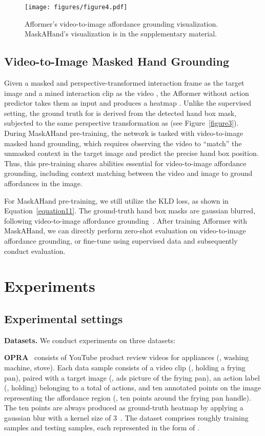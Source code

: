 \documentclass[10pt,twocolumn,letterpaper]{article}
\begin{document}
{\begin{figure*}[t]
    \centering
    \texttt{[image: figures/figure4.pdf]}
    \caption{Afformer's video-to-image affordance grounding visualization. MaskAHand's visualization is in the supplementary material. \vspace{-3mm}}
    \label{figure4}
\end{figure*}

\subsection{Video-to-Image Masked Hand Grounding}

Given a masked and perspective-transformed interaction frame as the target image  and a mined interaction clip as the video , the Afformer without action predictor  takes them as input and produces a heatmap . Unlike the supervised setting, the ground truth for  is derived from the detected hand box mask, subjected to the same perspective transformation as  (see Figure~\ref{figure3}). During MaskAHand pre-training, the network is tasked with video-to-image masked hand grounding, which requires observing the video to ``match'' the unmasked context in the target image and predict the precise hand box position. Thus, this pre-training shares abilities essential for video-to-image affordance grounding, including context matching between the video and image to ground affordances in the image.

For MaskAHand pre-training, we still utilize the KLD loss, as shown in Equation~\ref{equation11}. The ground-truth hand box masks are gaussian blurred, following video-to-image affordance grounding~\cite{demo2vec}. After training Afformer with MaskAHand, we can directly perform zero-shot evaluation on video-to-image affordance grounding, or fine-tune using supervised data and subsequently conduct evaluation.

\section{Experiments}

\subsection{Experimental settings}

\noindent\textbf{Datasets.} We conduct experiments on three datasets:

\noindent
 \textbf{OPRA}~\cite{demo2vec} consists of YouTube product review videos for appliances (\eg, washing machine, stove). Each data sample consists of a video clip  (\eg, holding a frying pan), paired with a target image  (\eg, ads picture of the frying pan), an action label  (\eg, holding) belonging to a total of  actions, and ten annotated points on the image representing the affordance region (\eg, ten points around the frying pan handle). The ten points are always produced as ground-truth heatmap  by applying a gaussian blur with a kernel size of 3~\cite{demo2vec,hotspot,hagnet}. The dataset comprises roughly  training samples and  testing samples, each represented in the form of .

}
\end{document}

